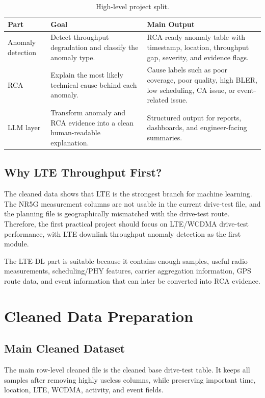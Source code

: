\documentclass[12pt,a4paper]{article}
\begin{document}
\begin{table}[H]
\centering
\begin{tabularx}{\textwidth}{@{}L{0.23\textwidth}YY@{}}
\toprule
\textbf{Part} & \textbf{Goal} & \textbf{Main Output} \\
\midrule
Anomaly detection & Detect throughput degradation and classify the anomaly type. & RCA-ready anomaly table with timestamp, location, throughput gap, severity, and evidence flags. \\
RCA & Explain the most likely technical cause behind each anomaly. & Cause labels such as poor coverage, poor quality, high BLER, low scheduling, CA issue, or event-related issue. \\
LLM layer & Transform anomaly and RCA evidence into a clean human-readable explanation. & Structured output for reports, dashboards, and engineer-facing summaries. \\
\bottomrule
\end{tabularx}
\caption{High-level project split.}
\end{table}

\subsection{Why LTE Throughput First?}

The cleaned data shows that LTE is the strongest branch for machine learning. The NR5G measurement columns are not usable in the current drive-test file, and the planning file is geographically mismatched with the drive-test route. Therefore, the first practical project should focus on LTE/WCDMA drive-test performance, with LTE downlink throughput anomaly detection as the first module.

The LTE-DL part is suitable because it contains enough samples, useful radio measurements, scheduling/PHY features, carrier aggregation information, GPS route data, and event information that can later be converted into RCA evidence.

\section{Cleaned Data Preparation}

\subsection{Main Cleaned Dataset}

The main row-level cleaned file is the cleaned base drive-test table. It keeps all samples after removing highly useless columns, while preserving important time, location, LTE, WCDMA, activity, and event fields.
\end{document}
